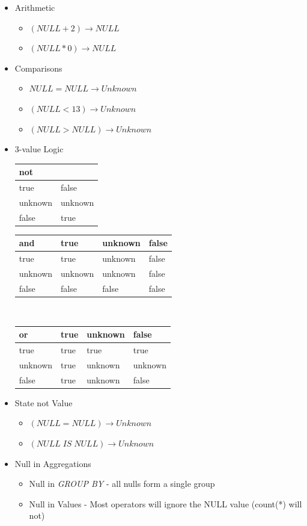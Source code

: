 \begin{itemize}
\item Arithmetic \begin{itemize}
\item $(NULL + 2) \to NULL$
\item $(NULL *0) \to NULL$
\end{itemize}
\item Comparisons\begin{itemize}
\item $NULL = NULL \to Unknown$
\item $(NULL < 13) \to Unknown$
\item $(NULL > NULL) \to Unknown$
\end{itemize}
\item 3-value Logic\vspace{.2cm}\\
\begin{minipage}[t]{.3\textwidth}
\begin{tabular}{|l|l|}
\hline
\textbf{not} &            \\ \hline
true         & false     \\ \hline
unknown      & unknown  \\ \hline
false        & true     \\ \hline
\end{tabular}
\end{minipage}
\begin{minipage}[t]{.3\textwidth}
\begin{tabular}{|l|l|l|l|}
\hline
\textbf{and} & true & unknown & false \\ \hline
true & true & unknown & false \\ \hline
unknown & unknown & unknown & false \\ \hline
false & false & false & false \\ \hline
\end{tabular}\vspace{.2cm}\\
\begin{tabular}{|l|l|l|l|}
\hline
\textbf{or} & true & unknown & false \\ \hline
true & true & true & true \\ \hline
unknown & true & unknown & unknown \\ \hline
false & true & unknown & false \\ \hline
\end{tabular}
\end{minipage}
\item State not Value\begin{itemize}
\item $(NULL = NULL) \to Unknown$
\item $(NULL\;IS\;NULL) \to Unknown$
\end{itemize}
\item Null in Aggregations \begin{itemize}
\item Null in \textit{GROUP BY} - all nulls form a single group
\item Null in Values - Most operators will ignore the NULL value (count(*) will not)
\end{itemize}
\end{itemize}
